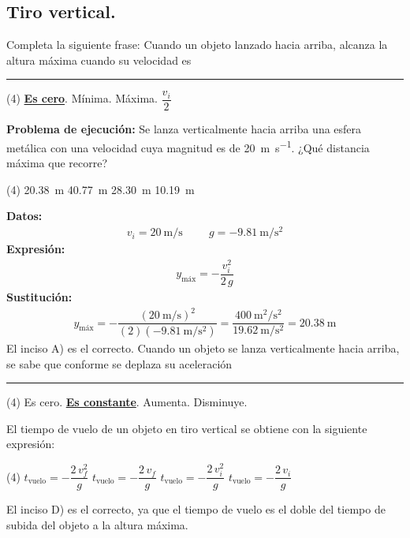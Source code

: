 \documentclass[12pt, letter]{exam}
\begin{document}
\begin{questions}
    \newpage

    \section{Tiro vertical.}

    \question Completa la siguiente frase: Cuando un objeto lanzado hacia arriba, alcanza la altura máxima cuando su velocidad es \rule{2cm}{0.3mm}
    \begin{tasks}(4)
        \task \underline{\textbf{Es cero}}.
        \task Mínima.
        \task Máxima.
        \task $\dfrac{v_{i}}{2}$
    \end{tasks}
    \question \label{Problema_03} \textbf{Problema de ejecución: }Se lanza verticalmente hacia arriba una esfera metálica con una velocidad cuya magnitud es de \SI{20}{\meter\per\second}. ¿Qué distancia máxima que recorre?
    \begin{tasks}(4)
        \task \SI{20.38}{\meter}
        \task \SI{40.77}{\meter}
        \task \SI{28.30}{\meter}
        \task \SI{10.19}{\meter}
    \end{tasks}
    \textbf{Datos:}
    \begin{align*}
    v_{i} = \SI{20}{\meter\per\second} \hspace{1cm} g = - \SI{9.81}{\meter\per\square\second}
    \end{align*}
    \textbf{Expresión:}
    \begin{align*}
    y_{\text{máx}} = - \dfrac{v_{i}^{2}}{2 \, g}
    \end{align*}
    \textbf{Sustitución:}
    \begin{align*}
    y_{\text{máx}} = - \dfrac{\displaystyle \left( \SI{20}{\meter\per\second} \right)^{2}}{\displaystyle (2) \left( - \SI{9.81}{\meter\per\square\second} \right)} = \dfrac{\displaystyle \SI{400}{\square\meter\per\square\second}}{\displaystyle \SI{19.62}{\meter\per\square\second}} = \SI{20.38}{\meter}
    \end{align*}
    El inciso A) es el correcto.
    \question Cuando un objeto se lanza verticalmente hacia arriba, se sabe que conforme se deplaza su aceleración \rule{2cm}{0.3mm}
    \begin{tasks}(4)
        \task Es cero.
        \task \underline{\textbf{Es constante}}.
        \task Aumenta.
        \task Disminuye.
    \end{tasks}
    \question El tiempo de vuelo de un objeto en tiro vertical se obtiene con la siguiente expresión:
    \begin{tasks}(4)
        \task $t_{\text{vuelo}} = - \dfrac{2 \, v_{f}^{2}}{g}$
        \task $t_{\text{vuelo}} = - \dfrac{2 \, v_{f}}{g}$
        \task $t_{\text{vuelo}} = - \dfrac{2 \, v_{i}^{2}}{g}$
        \task $t_{\text{vuelo}} = - \dfrac{2 \, v_{i}}{g}$
    \end{tasks}
    El inciso D) es el correcto, ya que el tiempo de vuelo es el doble del tiempo de subida del objeto a la altura máxima.
    


\end{questions}
\end{document}
